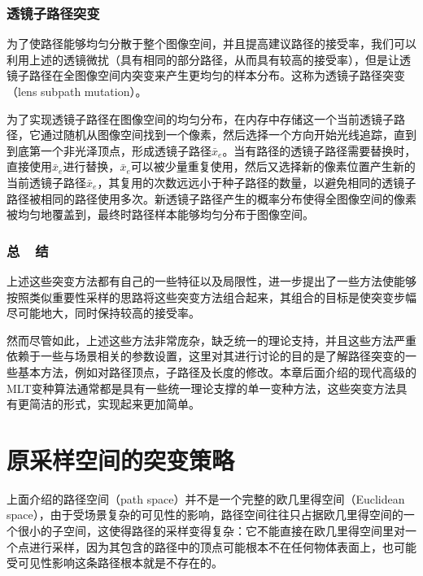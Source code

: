 \subsubsection{透镜子路径突变}
为了使路径能够均匀分散于整个图像空间，并且提高建议路径的接受率，我们可以利用上述的透镜微扰（具有相同的部分路径，从而具有较高的接受率），但是让透镜子路径在全图像空间内突变来产生更均匀的样本分布。这称为透镜子路径突变（lens subpath mutation）。

为了实现透镜子路径在图像空间的均匀分布，\cite{a:MetropolisLightTransport}在内存中存储这一个当前透镜子路径，它通过随机从图像空间找到一个像素，然后选择一个方向开始光线追踪，直到到底第一个非光泽顶点，形成透镜子路径$\bar{x}_e$。当有路径的透镜子路径需要替换时，直接使用$\bar{x}_e$进行替换，$\bar{x}_e$可以被少量重复使用，然后又选择新的像素位置产生新的当前透镜子路径$\bar{x}_e$，其复用的次数远远小于种子路径的数量，以避免相同的透镜子路径被相同的路径使用多次。新透镜子路径产生的概率分布使得全图像空间的像素被均匀地覆盖到，最终时路径样本能够均匀分布于图像空间。




\subsubsection{总~~结}
上述这些突变方法都有自己的一些特征以及局限性，\cite{a:MetropolisLightTransport}进一步提出了一些方法使能够按照类似重要性采样的思路将这些突变方法组合起来，其组合的目标是使突变步幅尽可能地大，同时保持较高的接受率。

然而尽管如此，上述这些方法非常庞杂，缺乏统一的理论支持，并且这些方法严重依赖于一些与场景相关的参数设置，这里对其进行讨论的目的是了解路径突变的一些基本方法，例如对路径顶点，子路径及长度的修改。本章后面介绍的现代高级的MLT变种算法通常都是具有一些统一理论支撑的单一变种方法，这些突变方法具有更简洁的形式，实现起来更加简单。






\section{原采样空间的突变策略}\label{sec:mlt-pssmlt}
上面介绍的路径空间（path space）并不是一个完整的欧几里得空间（Euclidean space），由于受场景复杂的可见性的影响，路径空间往往只占据欧几里得空间的一个很小的子空间，这使得路径的采样变得复杂：它不能直接在欧几里得空间里对一个点进行采样，因为其包含的路径中的顶点可能根本不在任何物体表面上，也可能受可见性影响这条路径根本就是不存在的。

